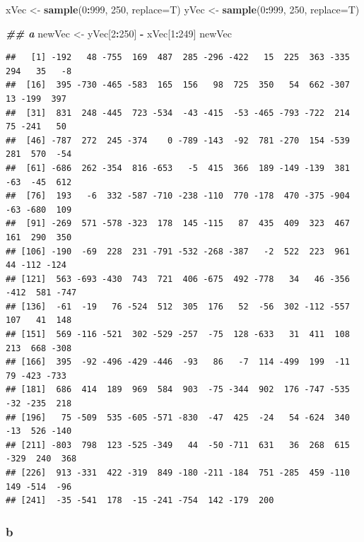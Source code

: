 \documentclass[
]{article}
\newenvironment{Shaded}{\begin{snugshade}}{\end{snugshade}}
\newcommand{\AttributeTok}[1]{\textcolor[rgb]{0.13,0.29,0.53}{#1}}
\newcommand{\DecValTok}[1]{\textcolor[rgb]{0.00,0.00,0.81}{#1}}
\newcommand{\DocumentationTok}[1]{\textcolor[rgb]{0.56,0.35,0.01}{\textbf{\textit{#1}}}}
\newcommand{\FunctionTok}[1]{\textcolor[rgb]{0.13,0.29,0.53}{\textbf{#1}}}
\newcommand{\NormalTok}[1]{#1}
\newcommand{\OtherTok}[1]{\textcolor[rgb]{0.56,0.35,0.01}{#1}}
\newcommand{\SpecialCharTok}[1]{\textcolor[rgb]{0.81,0.36,0.00}{\textbf{#1}}}
\begin{document}
\begin{Shaded}
\begin{Highlighting}[]
\NormalTok{xVec }\OtherTok{\textless{}{-}} \FunctionTok{sample}\NormalTok{(}\DecValTok{0}\SpecialCharTok{:}\DecValTok{999}\NormalTok{, }\DecValTok{250}\NormalTok{, }\AttributeTok{replace=}\NormalTok{T)}
\NormalTok{yVec }\OtherTok{\textless{}{-}} \FunctionTok{sample}\NormalTok{(}\DecValTok{0}\SpecialCharTok{:}\DecValTok{999}\NormalTok{, }\DecValTok{250}\NormalTok{, }\AttributeTok{replace=}\NormalTok{T)}

\DocumentationTok{\#\# a}
\NormalTok{newVec }\OtherTok{\textless{}{-}}\NormalTok{ yVec[}\DecValTok{2}\SpecialCharTok{:}\DecValTok{250}\NormalTok{] }\SpecialCharTok{{-}}\NormalTok{ xVec[}\DecValTok{1}\SpecialCharTok{:}\DecValTok{249}\NormalTok{]}
\NormalTok{newVec}
\end{Highlighting}
\end{Shaded}

\begin{verbatim}
##   [1] -192   48 -755  169  487  285 -296 -422   15  225  363 -335  294   35   -8
##  [16]  395 -730 -465 -583  165  156   98  725  350   54  662 -307   13 -199  397
##  [31]  831  248 -445  723 -534  -43 -415  -53 -465 -793 -722  214   75 -241   50
##  [46] -787  272  245 -374    0 -789 -143  -92  781 -270  154 -539  281  570  -54
##  [61] -686  262 -354  816 -653   -5  415  366  189 -149 -139  381  -63  -45  612
##  [76]  193   -6  332 -587 -710 -238 -110  770 -178  470 -375 -904  -63 -680  109
##  [91] -269  571 -578 -323  178  145 -115   87  435  409  323  467  161  290  350
## [106] -190  -69  228  231 -791 -532 -268 -387   -2  522  223  961   44 -112 -124
## [121]  563 -693 -430  743  721  406 -675  492 -778   34   46 -356 -412  581 -747
## [136]  -61  -19   76 -524  512  305  176   52  -56  302 -112 -557  107   41  148
## [151]  569 -116 -521  302 -529 -257  -75  128 -633   31  411  108  213  668 -308
## [166]  395  -92 -496 -429 -446  -93   86   -7  114 -499  199  -11   79 -423 -733
## [181]  686  414  189  969  584  903  -75 -344  902  176 -747 -535  -32 -235  218
## [196]   75 -509  535 -605 -571 -830  -47  425  -24   54 -624  340  -13  526 -140
## [211] -803  798  123 -525 -349   44  -50 -711  631   36  268  615 -329  240  368
## [226]  913 -331  422 -319  849 -180 -211 -184  751 -285  459 -110  149 -514  -96
## [241]  -35 -541  178  -15 -241 -754  142 -179  200
\end{verbatim}

\subsubsection{b}\label{b}
\end{document}
